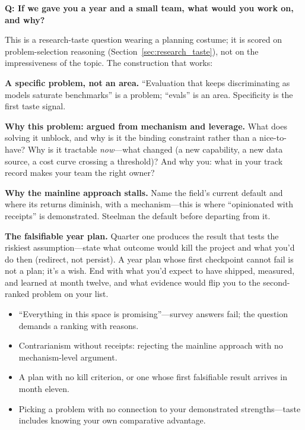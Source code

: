 \begin{interviewq}
\textbf{Q: If we gave you a year and a small team, what would you work on, and why?}

 \quad {} \quad \badgefreq{\freqmed}

\stronganswer

This is a research-taste question wearing a planning costume; it is scored on problem-selection reasoning (Section~\ref{sec:research_taste}), not on the impressiveness of the topic. The construction that works:

\textbf{A specific problem, not an area.} ``Evaluation that keeps discriminating as models saturate benchmarks'' is a problem; ``evals'' is an area. Specificity is the first taste signal.

\textbf{Why this problem: argued from mechanism and leverage.} What does solving it unblock, and why is it the binding constraint rather than a nice-to-have? Why is it tractable \textit{now}---what changed (a new capability, a new data source, a cost curve crossing a threshold)? And why you: what in your track record makes your team the right owner?

\textbf{Why the mainline approach stalls.} Name the field's current default and where its returns diminish, with a mechanism---this is where ``opinionated with receipts'' is demonstrated. Steelman the default before departing from it.

\textbf{The falsifiable year plan.} Quarter one produces the result that tests the riskiest assumption---state what outcome would kill the project and what you'd do then (redirect, not persist). A year plan whose first checkpoint cannot fail is not a plan; it's a wish. End with what you'd expect to have shipped, measured, and learned at month twelve, and what evidence would flip you to the second-ranked problem on your list.

\redflags
\begin{itemize}
    \item ``Everything in this space is promising''---survey answers fail; the question demands a ranking with reasons.
    \item Contrarianism without receipts: rejecting the mainline approach with no mechanism-level argument.
    \item A plan with no kill criterion, or one whose first falsifiable result arrives in month eleven.
    \item Picking a problem with no connection to your demonstrated strengths---taste includes knowing your own comparative advantage.
\end{itemize}


\end{interviewq}
